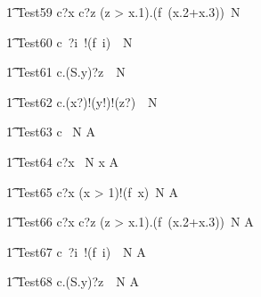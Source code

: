 \begin{circusaction}
   \t1 Test59 \circdef c?x \then c?z \prefixcolon (z > x.1).(f~(x.2+x.3))\circat~N \then \Skip
\end{circusaction}

\begin{circusaction}
   \t1 Test60 \circdef c~?i~!(f~i)~\circat~N \then \Skip
\end{circusaction}

\begin{circusaction}
   \t1 Test61 \circdef c.(S.y)?z~\circat~N \then \Skip
\end{circusaction}

\begin{circusaction}
   \t1 Test62 \circdef c.(x?)!(y!)!(z?)~\circat~N \then \Skip
\end{circusaction}



\begin{circusaction}
   \t1 Test63 \circdef c \circat~N  \then {} \rcirctime A \\
\end{circusaction}

\begin{circusaction}
   \t1 Test64 \circdef c?x \circat~N  \then \lcirctime x \rcirctime A \\
\end{circusaction}

\begin{circusaction}
   \t1 Test65 \circdef c?x \prefixcolon (x > 1)!(f~x)\circat~N \then {} \rcirctime A \\
\end{circusaction}

\begin{circusaction}
   \t1 Test66 \circdef c?x \then c?z \prefixcolon (z > x.1).(f~(x.2+x.3))\circat~N \then {} \rcirctime A \\
\end{circusaction}

\begin{circusaction}
   \t1 Test67 \circdef c~?i~!(f~i)~\circat~N \then {} \rcirctime A \\
\end{circusaction}

\begin{circusaction}
   \t1 Test68 \circdef c.(S.y)?z~\circat~N \then {} \rcirctime A \\
\end{circusaction}

